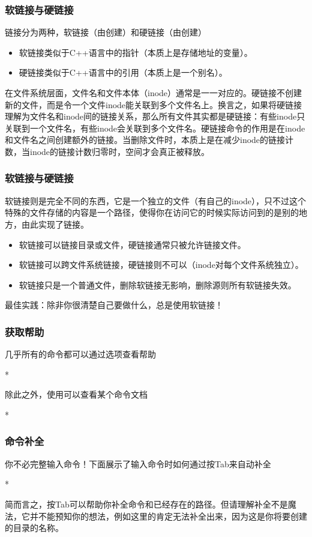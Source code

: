 \begin{frame}
    \frametitle{软链接与硬链接}
    链接分为两种，软链接（由创建）和硬链接（由创建）
    \begin{itemize}
        \item 软链接类似于C++语言中的指针（本质上是存储地址的变量）。
        \item 硬链接类似于C++语言中的引用（本质上是一个别名）。
    \end{itemize}
    在文件系统层面，文件名和文件本体（inode）通常是一一对应的。硬链接不创建新的文件，而是令一个文件inode能关联到多个文件名上。换言之，如果将硬链接理解为文件名和inode间的链接关系，那么所有文件其实都是硬链接：有些inode只关联到一个文件名，有些inode会关联到多个文件名。硬链接命令的作用是在inode和文件名之间创建额外的链接。当删除文件时，本质上是在减少inode的链接计数，当inode的链接计数归零时，空间才会真正被释放。
\end{frame}

\begin{frame}
    \frametitle{软链接与硬链接}
    软链接则是完全不同的东西，它是一个独立的文件（有自己的inode），只不过这个特殊的文件存储的内容是一个路径，使得你在访问它的时候实际访问到的是别的地方，由此实现了链接。
    \begin{itemize}
        \item 软链接可以链接目录或文件，硬链接通常只被允许链接文件。
        \item 软链接可以跨文件系统链接，硬链接则不可以（inode对每个文件系统独立）。
        \item 软链接只是一个普通文件，删除软链接无影响，删除源则所有软链接失效。
    \end{itemize}
    最佳实践：除非你很清楚自己要做什么，\alert{总是使用软链接}！
\end{frame}

\begin{frame}
    \frametitle{获取帮助}
    几乎所有的命令都可以通过选项查看帮助
    \begin{Code}*
        
    \end{Code}
    除此之外，使用可以查看某个命令文档
    \begin{Code}*
        
    \end{Code}
\end{frame}

\begin{frame}
    \frametitle{命令补全}
    你不必完整输入命令！下面展示了输入命令时如何通过按Tab来自动补全
    \begin{Code}*
        
    \end{Code}
    简而言之，按Tab可以帮助你补全命令和已经存在的路径。但请理解补全不是魔法，它并不能预知你的想法，例如这里的肯定无法补全出来，因为这是你将要创建的目录的名称。
\end{frame}

